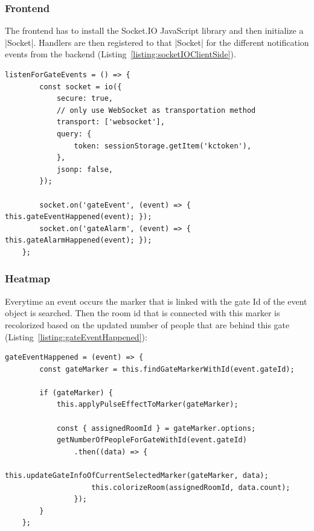 \subsubsection{Frontend}
\label{Frontend}

The frontend has to install the Socket.IO JavaScript library and then initialize a |Socket|\cite{socketio:socket}. Handlers are then registered to that |Socket| for the different notification events from the backend (Listing~\ref{listing:socketIOClientSide}).

\begin{lstlisting}[label={listing:socketIOClientSide},caption={Setup of Socket.IO socket}]
listenForGateEvents = () => {
        const socket = io({
            secure: true,
            // only use WebSocket as transportation method
            transport: ['websocket'],
            query: {
                token: sessionStorage.getItem('kctoken'),
            },
            jsonp: false,
        });

        socket.on('gateEvent', (event) => { this.gateEventHappened(event); });
        socket.on('gateAlarm', (event) => { this.gateAlarmHappened(event); });
    };
\end{lstlisting}


\subsubsection{Heatmap}

Everytime an event occurs the marker that is linked with the gate Id of the event object is searched. Then the room id that is connected with this marker is recolorized based on the updated number of people that are behind this gate (Listing~\ref{listing:gateEventHappened}):

\begin{lstlisting}[label={listing:gateEventHappened},caption={Handling gate events in frontend}]
gateEventHappened = (event) => {
        const gateMarker = this.findGateMarkerWithId(event.gateId);

        if (gateMarker) {
            this.applyPulseEffectToMarker(gateMarker);

            const { assignedRoomId } = gateMarker.options;
            getNumberOfPeopleForGateWithId(event.gateId)
                .then((data) => {
                    this.updateGateInfoOfCurrentSelectedMarker(gateMarker, data);
                    this.colorizeRoom(assignedRoomId, data.count);
                });
        }
    };
\end{lstlisting}

